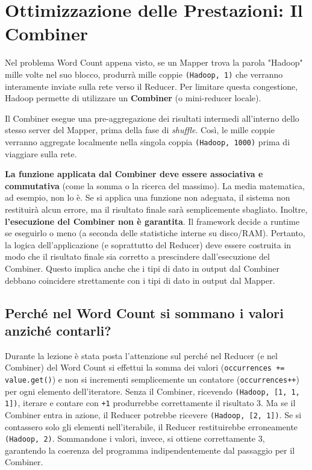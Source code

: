 \section{Ottimizzazione delle Prestazioni: Il Combiner}
\label{sec:combiner}

Nel problema Word Count appena visto, se un Mapper trova la parola "Hadoop" mille volte nel suo blocco, produrrà mille coppie \texttt{(Hadoop, 1)} che verranno interamente inviate sulla rete verso il Reducer. Per limitare questa congestione, Hadoop permette di utilizzare un \textbf{Combiner} (o mini-reducer locale).

Il Combiner esegue una pre-aggregazione dei risultati intermedi all'interno dello stesso server del Mapper, prima della fase di \textit{shuffle}. Così, le mille coppie verranno aggregate localmente nella singola coppia \texttt{(Hadoop, 1000)} prima di viaggiare sulla rete.

\begin{remark}
\textbf{La funzione applicata dal Combiner deve essere associativa e commutativa} (come la somma o la ricerca del massimo). La media matematica, ad esempio, non lo è. Se si applica una funzione non adeguata, il sistema non restituirà alcun errore, ma il risultato finale sarà semplicemente sbagliato.
Inoltre, \textbf{l'esecuzione del Combiner non è garantita}. Il framework decide a runtime se eseguirlo o meno (a seconda delle statistiche interne su disco/RAM). Pertanto, la logica dell'applicazione (e soprattutto del Reducer) deve essere costruita in modo che il risultato finale sia corretto a prescindere dall'esecuzione del Combiner. Questo implica anche che i tipi di dato in output dal Combiner debbano coincidere strettamente con i tipi di dato in output dal Mapper.
\end{remark}

\subsection{Perché nel Word Count si sommano i valori anziché contarli?}
Durante la lezione è stata posta l'attenzione sul perché nel Reducer (e nel Combiner) del Word Count si effettui la somma dei valori (\texttt{occurrences += value.get()}) e non si incrementi semplicemente un contatore (\texttt{occurrences++}) per ogni elemento dell'iteratore.
Senza il Combiner, ricevendo \texttt{(Hadoop, [1, 1, 1])}, iterare e contare con \texttt{+1} produrrebbe correttamente il risultato 3. Ma se il Combiner entra in azione, il Reducer potrebbe ricevere \texttt{(Hadoop, [2, 1])}. Se si contassero solo gli elementi nell'iterabile, il Reducer restituirebbe erroneamente \texttt{(Hadoop, 2)}. Sommandone i valori, invece, si ottiene correttamente 3, garantendo la coerenza del programma indipendentemente dal passaggio per il Combiner.

